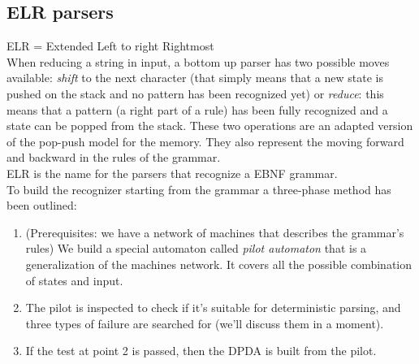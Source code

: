 		\subsection{ELR parsers}
			ELR = Extended Left to right Rightmost\\
			When reducing a string in input, a bottom up parser has two possible moves available: \emph{shift} to the next character (that simply means that a new state is pushed on the stack and no pattern has been recognized yet) or \emph{reduce}: this means that a pattern (a right part of a rule) has been fully recognized and a state can be popped from the stack. These two operations are an adapted version of the pop-push model for the memory. They also represent the moving forward and backward in the rules of the grammar.\\
			ELR is the name for the parsers that recognize a EBNF grammar.\\
			To build the recognizer starting from the grammar a three-phase method has been outlined:
			\begin{enumerate}
				\item (Prerequisites: we have a network of machines that describes the grammar's rules) We build a special automaton called \emph{pilot automaton} that is a generalization of the machines network. It covers all the possible combination of states and input.
				\item The pilot is inspected to check if it's suitable for deterministic parsing, and three types of failure are searched for (we'll discuss them in a moment).
				\item If the test at point 2 is passed, then the DPDA is built from the pilot. 
			\end{enumerate}
			
